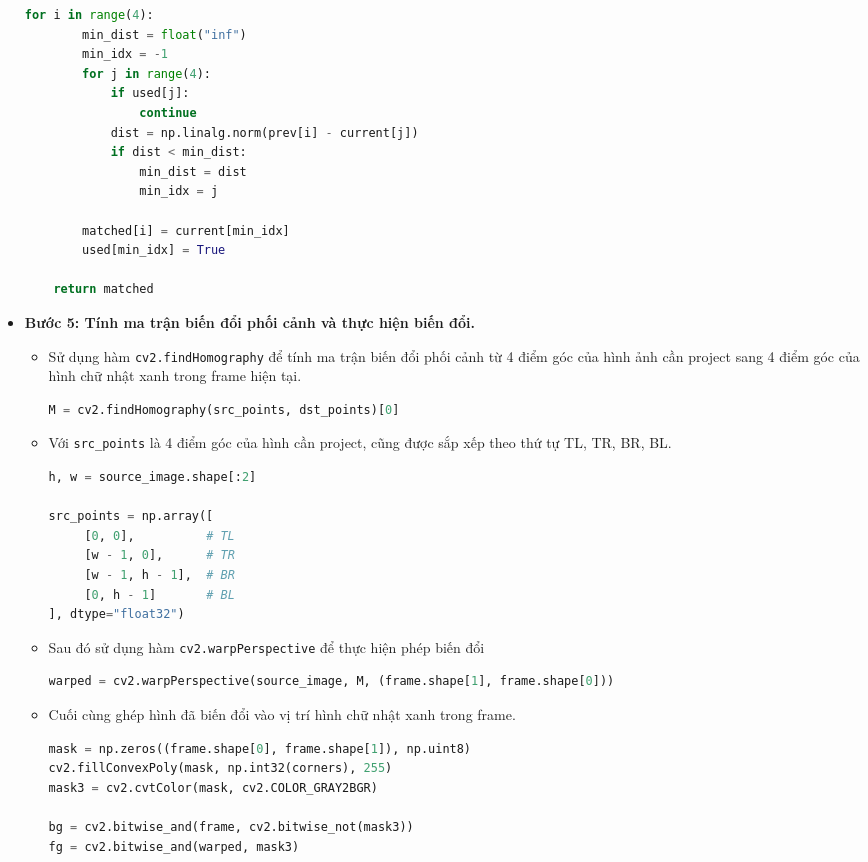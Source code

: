\begin{itemize}
\begin{lstlisting}[language=Python]
    for i in range(4):
        min_dist = float("inf")
        min_idx = -1
        for j in range(4):
            if used[j]:
                continue
            dist = np.linalg.norm(prev[i] - current[j])
            if dist < min_dist:
                min_dist = dist
                min_idx = j
        
        matched[i] = current[min_idx]
        used[min_idx] = True

    return matched
               \end{lstlisting}  
               \item \textbf{Bước 5: Tính ma trận biến đổi phối cảnh và thực hiện biến đổi.}    
               \begin{itemize}
                    \item Sử dụng hàm \texttt{cv2.findHomography} để tính ma trận biến đổi phối cảnh từ 4 điểm góc của hình ảnh cần project sang 4 điểm góc của hình chữ nhật xanh trong frame hiện tại.
               \begin{lstlisting}[language=Python]
M = cv2.findHomography(src_points, dst_points)[0]
               \end{lstlisting}
               \item Với \texttt{src\_points} là 4 điểm góc của hình cần project, cũng được sắp xếp theo thứ tự TL, TR, BR, BL.
               \begin{lstlisting}[language=Python]
h, w = source_image.shape[:2]

src_points = np.array([
     [0, 0],          # TL
     [w - 1, 0],      # TR
     [w - 1, h - 1],  # BR
     [0, h - 1]       # BL
], dtype="float32")
               \end{lstlisting}    
               \item Sau đó sử dụng hàm \texttt{cv2.warpPerspective} để thực hiện phép biến đổi 
               \begin{lstlisting}[language=Python]
warped = cv2.warpPerspective(source_image, M, (frame.shape[1], frame.shape[0]))
               \end{lstlisting}   
               \item Cuối cùng ghép hình đã biến đổi vào vị trí hình chữ nhật xanh trong frame.              
               \begin{lstlisting}[language=Python]
mask = np.zeros((frame.shape[0], frame.shape[1]), np.uint8)
cv2.fillConvexPoly(mask, np.int32(corners), 255)
mask3 = cv2.cvtColor(mask, cv2.COLOR_GRAY2BGR)

bg = cv2.bitwise_and(frame, cv2.bitwise_not(mask3))
fg = cv2.bitwise_and(warped, mask3)


\end{lstlisting}
\end{itemize}
\end{itemize}
